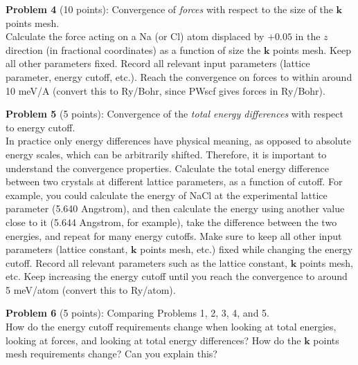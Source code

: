 \documentclass[12pt]{article}
\begin{document}
  \noindent
  {\bf Problem 4} (10 points):
  Convergence of {\em forces} with respect to the size of the $\mathbf{k}$ points mesh. \\

  \noindent
  Calculate the force acting on a Na (or Cl) atom displaced by $+0.05$ in the $z$
  direction (in fractional coordinates) as a function of size the $\mathbf{k}$ points mesh.
  Keep all other parameters fixed. Record all relevant input parameters (lattice parameter, energy cutoff, etc.).
  Reach the convergence on forces to within around 10 meV/A
  (convert this to Ry/Bohr, since PWscf gives forces in Ry/Bohr).
  \vspace{10mm}


  \noindent
  {\bf Problem 5} (5 points):
  Convergence of the {\em total energy differences} with respect to energy cutoff. \\

  \noindent
  In practice only energy differences have physical meaning, as opposed to
  absolute energy scales, which can be arbitrarily shifted.
  Therefore, it is important to understand the convergence properties.
  Calculate the total energy difference between two crystals
  at different lattice parameters, as a function of cutoff.
  For example, you could calculate the energy of NaCl at the experimental
  lattice parameter (5.640 Angstrom), and then calculate the energy using another
  value close to it (5.644 Angstrom, for example), take the difference between the
  two energies, and repeat for many energy cutoffs.
  Make sure to keep all other input parameters (lattice constant, $\mathbf{k}$ points mesh, etc.)
  fixed while changing the energy cutoff.
  Record all relevant parameters such as the lattice constant, $\mathbf{k}$ points mesh, etc.
  Keep increasing the energy cutoff until you reach the convergence to around 5 meV/atom (convert this to
  Ry/atom).
  \vspace{10mm}


  \noindent
  {\bf Problem 6} (5 points): Comparing Problems 1, 2, 3, 4, and 5. \\

  \noindent
  How do the energy cutoff requirements change when looking at total energies,
  looking at forces, and looking at total energy differences?
  How do the $\mathbf{k}$ points mesh requirements change?
  Can you explain this?
  \vspace{10mm}
\end{document}
